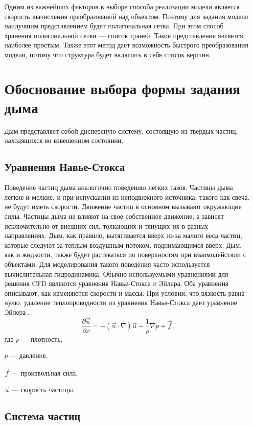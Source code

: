 Одним из важнейших факторов в выборе способа реализации модели является скорость вычисления преобразований над объектом. Поэтому для задания модели наилучшим представлением будет полигональная сетка. При этом способ хранения полигональной сетки --- список граней. Такое представление является наиболее простым. Также этот метод дает возможность быстрого преобразования модели, потому что структура будет включать в себя список вершин. 

\section {Обоснование выбора формы задания дыма}

Дым представляет собой дисперсную систему, состоящую из твердых частиц, находящихся во взвешенном состоянии.

\subsection{Уравнения Навье-Стокса}

Поведение частиц дыма аналогично поведению легких газов. Частицы дыма легкие и мелкие, и при испускании из неподвижного источника, такого как свеча, не будут иметь скорости. Движение частиц в основном вызывают окружающие силы. Частицы дыма не влияют на свое собственное движение, а зависят исключительно от внешних сил, толкающих и тянущих их в разных направлениях. Дым, как правило, вытягивается вверх из-за малого веса частиц, которые следуют за теплым воздушным потоком, поднимающимся вверх. Дым, как и жидкости, также будет растекаться по поверхностям при взаимодействии с объектами. Для моделирования такого поведения часто используется вычислительная гидродинамика. Обычно используемыми уравнениями для решения CFD являются уравнения Навье-Стокса и Эйлера. Оба уравнения описывают, как изменяются скорости и массы. При условии, что вязкость равна нулю, удаление теплопроводности из уравнения Навье-Стокса дает уравнение Эйлера \cite{cfd}. 
\begin{equation}
	\frac{\partial \vec{u}}{\partial x} = -(\vec{u}\cdot\nabla) \vec{u} - \frac{1}{\rho} \nabla p + \vec{f} \text{,}
\end{equation}
где
$\rho$ --- плотность,

$p$ --- давление,

$\vec{f}$ --- произвольная сила,

$\vec{u}$ --- скорость частицы.
\subsection{Система частиц}

